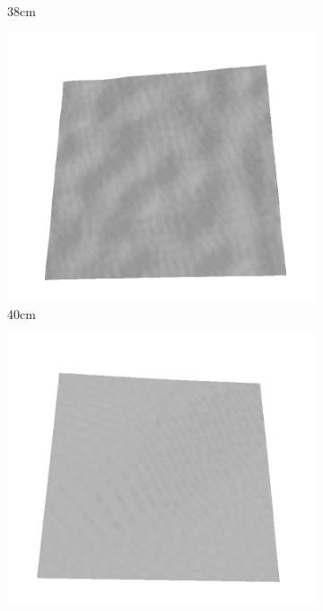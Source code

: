 \documentclass[../document.tex]{subfiles}
\begin{document}
\begin{figure}[htbp]
\begin{subfigure}[b]{0.19\textwidth}
    \caption{$38$cm}
    \end{subfigure}
    \begin{subfigure}[b]{0.19\textwidth}
    \includegraphics[width=\linewidth]{../img/5/train/all/40-patch-3d-majavi-20.png}
    \caption{$40$cm}
    \end{subfigure}
    \begin{subfigure}[b]{0.19\textwidth}
    \includegraphics[width=\linewidth]{../img/5/train/all/43-patch-3d-majavi-21.png}

\end{subfigure}
\end{figure}
\end{document}
